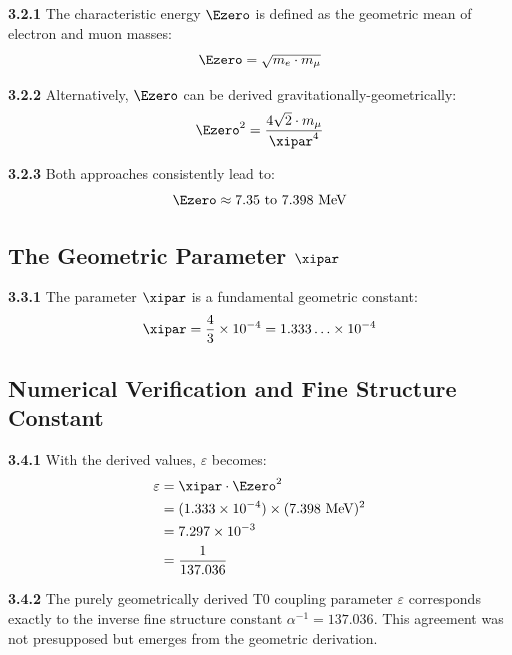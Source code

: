 	\noindent \textbf{3.2.1} The characteristic energy $\Ezero$ is defined as the geometric mean of electron and muon masses:
	\begin{equation}
		\Ezero = \sqrt{m_e \cdot m_\mu}
		\label{eq:E0_geometric_mean}
	\end{equation}
	
	\noindent \textbf{3.2.2} Alternatively, $\Ezero$ can be derived gravitationally-geometrically:
	\begin{equation}
		\Ezero^2 = \frac{4\sqrt{2} \cdot m_\mu}{\xipar^4}
		\label{eq:E0_gravitational}
	\end{equation}
	
	\noindent \textbf{3.2.3} Both approaches consistently lead to:
	\begin{equation}
		\Ezero \approx 7.35 \text{ to } 7.398 \text{ MeV}
	\end{equation}
	
	\subsection{The Geometric Parameter $\xipar$}
	
	\noindent \textbf{3.3.1} The parameter $\xipar$ is a fundamental geometric constant:
	\begin{equation}
		\xipar = \frac{4}{3} \times 10^{-4} = 1.333\ldots \times 10^{-4}
		\label{eq:xi_value}
	\end{equation}
	
	\subsection{Numerical Verification and Fine Structure Constant}
	
	\noindent \textbf{3.4.1} With the derived values, $\varepsilon$ becomes:
	\begin{align}
		\varepsilon &= \xipar \cdot \Ezero^2 \\
		&= (1.333 \times 10^{-4}) \times (7.398 \text{ MeV})^2 \\
		&= 7.297 \times 10^{-3} \\
		&= \frac{1}{137.036}
		\label{eq:epsilon_numerical}
	\end{align}
	
	\begin{tcolorbox}[colback=blue!5!white,colframe=blue!75!black,title=Remarkable Agreement]
		\textbf{3.4.2} The purely geometrically derived T0 coupling parameter $\varepsilon$ corresponds exactly to the inverse fine structure constant $\alpha^{-1} = 137.036$. This agreement was not presupposed but emerges from the geometric derivation.
	\end{tcolorbox}
	
